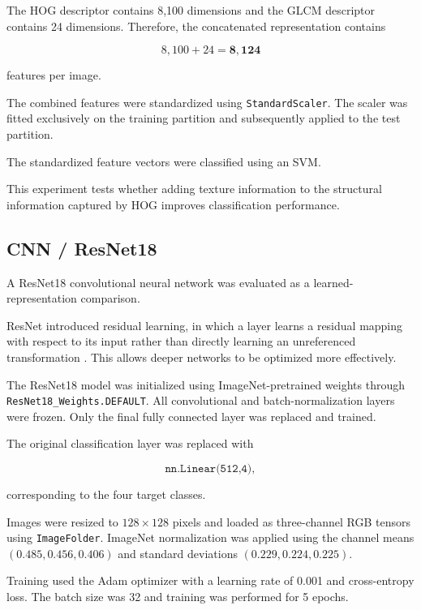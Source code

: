 \documentclass[11pt,a4paper]{article}
\begin{document}
The HOG descriptor contains 8,100 dimensions and the GLCM descriptor contains 24 dimensions. Therefore, the concatenated representation contains

\begin{equation}
8,100 + 24 =
\mathbf{8,124}
\end{equation}

features per image.

The combined features were standardized using \texttt{StandardScaler}. The scaler was fitted exclusively on the training partition and subsequently applied to the test partition.

The standardized feature vectors were classified using an SVM.

This experiment tests whether adding texture information to the structural information captured by HOG improves classification performance.

\subsection{CNN / ResNet18}

A ResNet18 convolutional neural network was evaluated as a learned-representation comparison.

ResNet introduced residual learning, in which a layer learns a residual mapping with respect to its input rather than directly learning an unreferenced transformation \cite{he2016deep}. This allows deeper networks to be optimized more effectively.

The ResNet18 model was initialized using ImageNet-pretrained weights through \texttt{ResNet18\_Weights.DEFAULT}. All convolutional and batch-normalization layers were frozen. Only the final fully connected layer was replaced and trained.

The original classification layer was replaced with

\begin{equation}
\texttt{nn.Linear(512,4)},
\end{equation}

corresponding to the four target classes.

Images were resized to $128 \times 128$ pixels and loaded as three-channel RGB tensors using \texttt{ImageFolder}. ImageNet normalization was applied using the channel means $(0.485,0.456,0.406)$ and standard deviations $(0.229,0.224,0.225)$.

Training used the Adam optimizer with a learning rate of 0.001 and cross-entropy loss. The batch size was 32 and training was performed for 5 epochs.
\end{document}

